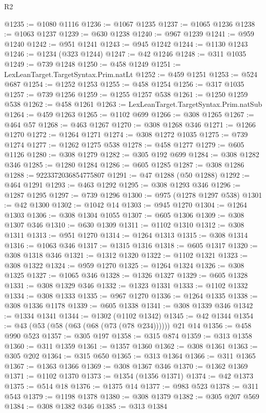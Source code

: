 \begin{lexlean}{R2}
\begin{coremodule}
@1235 := @1080 @1116
@1236 := @1067 @1235
@1237 := @1065 @1236
@1238 := @1063 @1237
@1239 := @630 @1238
@1240 := @967 @1239
@1241 := @959 @1240
@1242 := @951 @1241
@1243 := @945 @1242
@1244 := @1130 @1243
@1246 := @1234 (@323 @1244)
@1247 := @42 @1246
@1248 := @311 @1035
@1249 := @739 @1248
@1250 := @458 @1249
@1251 := LexLeanTarget.TargetSyntax.Prim.natLt
@1252 := @459 @1251
@1253 := @524 @687
@1254 := @1252 @1253
@1255 := @458 @1254
@1256 := @317 @1035
@1257 := @739 @1256
@1259 := @1255 @1257 @538
@1261 := @1250 @1259 @538
@1262 := @458 @1261
@1263 := LexLeanTarget.TargetSyntax.Prim.natSub
@1264 := @459 @1263
@1265 := @1102 @699
@1266 := @308 @1265
@1267 := @464 @57
@1268 := @463 @1267
@1270 := @308 @1268 @346
@1271 := @1266 @1270
@1272 := @1264 @1271
@1274 := @308 @1272 @1035
@1275 := @739 @1274
@1277 := @1262 @1275 @538
@1278 := @458 @1277
@1279 := @605 @1126
@1280 := @308 @1279
@1282 := @305 @192 @699
@1284 := @308 @1282 @346
@1285 := @1280 @1284
@1286 := @605 @1285
@1287 := @308 @1286
@1288 := 9223372036854775807
@1291 := @47 @1288 (@50 @1288)
@1292 := @464 @1291
@1293 := @463 @1292
@1295 := @308 @1293 @346
@1296 := @1287 @1295
@1297 := @739 @1296
@1300 := @975 (@1278 @1297 @538)
@1301 := @42 @1300
@1302 := @1042 @14
@1303 := @945 @1270
@1304 := @1264 @1303
@1306 := @308 @1304 @1055
@1307 := @605 @1306
@1309 := @308 @1307 @346
@1310 := @630 @1309
@1311 := @1102 @1310
@1312 := @308 @1311
@1313 := @951 @1270
@1314 := @1264 @1313
@1315 := @308 @1314
@1316 := @1063 @346
@1317 := @1315 @1316
@1318 := @605 @1317
@1320 := @308 @1318 @346
@1321 := @1312 @1320
@1322 := @1102 @1321
@1323 := @308 @1322
@1324 := @959 @1270
@1325 := @1264 @1324
@1326 := @308 @1325
@1327 := @1065 @346
@1328 := @1326 @1327
@1329 := @605 @1328
@1331 := @308 @1329 @346
@1332 := @1323 @1331
@1333 := @1102 @1332
@1334 := @308 @1333
@1335 := @967 @1270
@1336 := @1264 @1335
@1338 := @308 @1336 @1178
@1339 := @605 @1338
@1341 := @308 @1339 @346
@1342 := @1334 @1341
@1344 := @1302 (@1102 @1342)
@1345 := @42 @1344
@1354 := @43 (@53 (@58 (@63 (@68 (@73 (@78 @234)))))) @21 @14
@1356 := @458 @990 @523
@1357 := @305 @197
@1358 := @315 @874
@1359 := @313 @1358
@1360 := @311 @1359
@1361 := @1357 @1360
@1362 := @308 @1361
@1363 := @305 @202
@1364 := @315 @650
@1365 := @313 @1364
@1366 := @311 @1365
@1367 := @1363 @1366
@1369 := @308 @1367 @346
@1370 := @1362 @1369
@1371 := @1102 @1370
@1373 := @1354 (@1356 @1371)
@1374 := @42 @1373
@1375 := @514 @18
@1376 := @1375 @14
@1377 := @983 @523
@1378 := @311 @543
@1379 := @1198 @1378
@1380 := @308 @1379
@1382 := @305 @207 @569
@1384 := @308 @1382 @346
@1385 := @313 @1384

\end{coremodule}
\end{lexlean}
